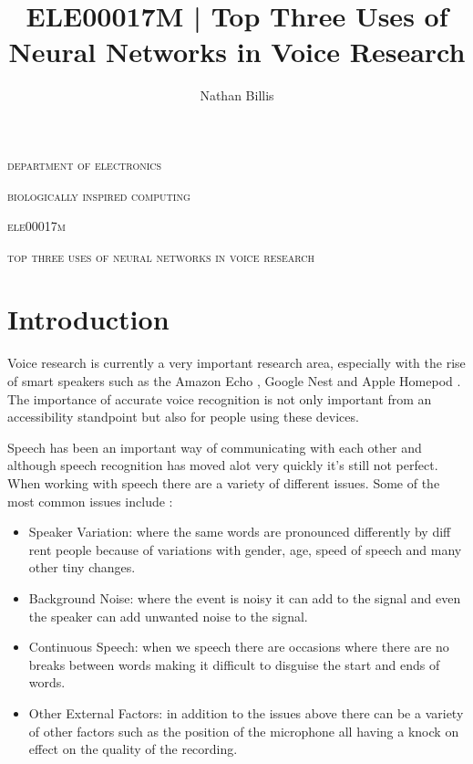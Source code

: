 \documentclass[11pt]{article}
\title{ 
    ELE00017M | Top Three Uses of Neural Networks in Voice Research
}
\author{Nathan Billis}
\begin{document}
\begin{titlepage}
    \centering
    {\scshape\LARGE department of electronics \par}
    \vspace{0.5cm}
    {\scshape\Large biologically inspired computing \par}
    \vspace{0.5cm}
    {\scshape\Large ele00017m \par}
    \vspace{2.5cm}
    {\scshape\Large top three uses of neural networks in voice research \par}
    \vfill
    {\Large\itshape \@author \par}
    \vspace{2cm}
    
    \tableofcontents

\end{titlepage}

	
\newpage

    \section{Introduction}
    
    Voice research is currently a very important research area, especially with the rise of smart speakers such as the Amazon Echo \cite{IntroducingRoom}, Google Nest \cite{GoogleStore} and Apple Homepod \cite{HomePodUK}. The importance of accurate voice recognition is not only important from an accessibility standpoint but also for people using these devices. 
    
    Speech has been an important way of communicating with each other and although speech recognition has moved alot very quickly it's still not perfect. When working with speech there are a variety of different issues. Some of the most common issues include \cite{Gevaert2010NeuralRecognition}: 
    \begin{itemize}
        \item Speaker Variation: where the same words are pronounced differently by diff rent people because of variations with gender, age, speed of speech and many other tiny changes.
        \item Background Noise: where the event is noisy it can add to the signal and even the speaker can add unwanted noise to the signal.
        \item Continuous Speech: when we speech there are occasions where there are no breaks between words making it difficult to disguise the start and ends of words.
        \item Other External Factors: in addition to the issues above there can be a variety of other factors such as the position of the microphone all having a knock on effect on the quality of the recording.
    \end{itemize}
    
\end{document}
